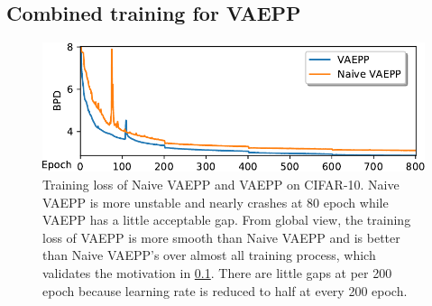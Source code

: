 \subsection{Combined training for VAEPP} \label{subsec:improve_of_vaepp}

\begin{figure}[tb]
	\centering
	\includegraphics[width=0.9\columnwidth]{../dist.strip/loss_curves}
	\caption{
	Training loss of Naive VAEPP and VAEPP on CIFAR-10. Naive VAEPP is more unstable and nearly crashes at 80 epoch while VAEPP has a little acceptable gap. From global view, the training loss of VAEPP is more smooth than Naive VAEPP and is better than Naive VAEPP's over almost all training process, which validates the motivation in \cref{subsec:improve_of_vaepp}. There are little gaps at per 200 epoch because learning rate is reduced to half at every 200 epoch. 
	}
	\label{fig:loss_curves}
\end{figure}


